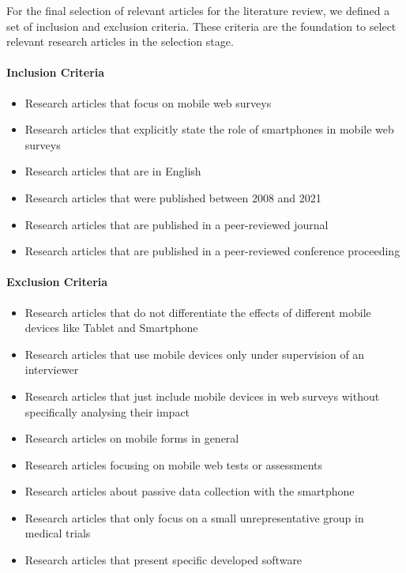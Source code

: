 For the final selection of relevant articles for the literature review, we defined a set of inclusion and exclusion criteria. These criteria are the foundation to select relevant research articles in the selection stage.

\paragraph{Inclusion Criteria}
\begin{itemize}
    \item Research articles that focus on mobile web surveys
    \item Research articles that explicitly state the role of smartphones in mobile web surveys
    \item Research articles that are in English
    \item Research articles that were published between 2008 and 2021
    \item Research articles that are published in a peer-reviewed journal
    \item Research articles that are published in a peer-reviewed conference proceeding
\end{itemize}

\paragraph{Exclusion Criteria}
\begin{itemize}
    \item Research articles that do not differentiate the effects of different mobile devices like Tablet and Smartphone
    \item Research articles that use mobile devices only under supervision of an interviewer
    \item Research articles that just include mobile devices in web surveys without specifically analysing their impact
    \item Research articles on mobile forms in general
    \item Research articles focusing on mobile web tests or assessments
    \item Research articles about passive data collection with the smartphone
    \item Research articles that only focus on a small unrepresentative group in medical trials
    \item Research articles that present specific developed software
\end{itemize}

